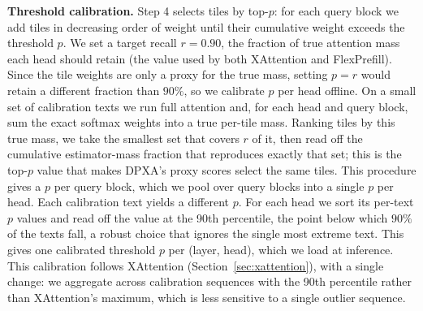 \textbf{Threshold calibration.} Step 4 selects tiles by top-$p$: for each query block we add tiles in decreasing order of weight until their cumulative weight exceeds the threshold $p$. We set a target recall $r = 0.90$, the fraction of true attention mass each head should retain (the value used by both XAttention and FlexPrefill). Since the tile weights are only a proxy for the true mass, setting $p = r$ would retain a different fraction than $90\%$, so we calibrate $p$ per head offline. On a small set of calibration texts we run full attention and, for each head and query block, sum the exact softmax weights into a true per-tile mass. Ranking tiles by this true mass, we take the smallest set that covers $r$ of it, then read off the cumulative estimator-mass fraction that reproduces exactly that set; this is the top-$p$ value that makes DPXA's proxy scores select the same tiles. This procedure gives a $p$ per query block, which we pool over query blocks into a single $p$ per head. Each calibration text yields a different $p$. For each head we sort its per-text $p$ values and read off the value at the 90th percentile, the point below which $90\%$ of the texts fall, a robust choice that ignores the single most extreme text. This gives one calibrated threshold $p$ per (layer, head), which we load at inference. This calibration follows XAttention (Section~\ref{sec:xattention}), with a single change: we aggregate across calibration sequences with the 90th percentile rather than XAttention's maximum, which is less sensitive to a single outlier sequence.

